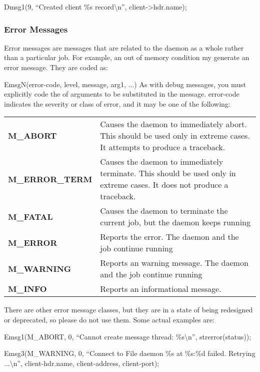 Dmsg1(9, ``Created client \%s record\textbackslash{}n'', client->hdr.name); 

\subsubsection*{Error Messages}

Error messages are messages that are related to the daemon as a whole rather
than a particular job. For example, an out of memory condition my generate an
error message. They are coded as: 

EmsgN(error-code, level, message, arg1, ...) As with debug messages, you must
explicitly code the of arguments to be substituted in the message. error-code
indicates the severity or class of error, and it may be one of the following: 

\begin{longtable}{lp{3in}}
{{\bf M\_ABORT}  } & {Causes the daemon to immediately abort. This should be
used only  in extreme cases. It attempts to produce a  traceback.  } \\
{{\bf M\_ERROR\_TERM}  } & {Causes the daemon to immediately terminate. This
should be used only  in extreme cases. It does not produce a  traceback.  } \\
{{\bf M\_FATAL}  } & {Causes the daemon to terminate the current job, but the
daemon keeps running  } \\
{{\bf M\_ERROR}  } & {Reports the error. The daemon and the job continue
running  } \\
{{\bf M\_WARNING}  } & {Reports an warning message. The daemon and the job
continue running  } \\
{{\bf M\_INFO}  } & {Reports an informational message. }

\end{longtable}

There are other error message classes, but they are in a state of being
redesigned or deprecated, so please do not use them. Some actual examples are:


Emsg1(M\_ABORT, 0, ``Cannot create message thread: \%s\textbackslash{}n'',
strerror(status)); 

Emsg3(M\_WARNING, 0, ``Connect to File daemon \%s at \%s:\%d failed. Retrying
...\textbackslash{}n'',  client-\gt{}hdr.name, client-\gt{}address,
client-\gt{}port); 

